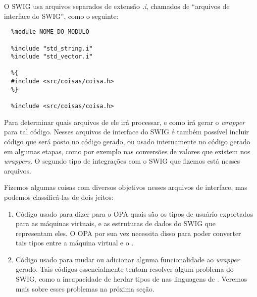   O SWIG usa arquivos separados de extensão \emph{.i}, chamados de ``arquivos de interface do 
  SWIG'', como o seguinte:
  \begin{lstlisting}
  %module NOME_DO_MODULO

  %include "std_string.i"
  %include "std_vector.i"
  
  %{
  #include <src/coisas/coisa.h>
  %}

  %include <src/coisas/coisa.h>
  \end{lstlisting}
  Para determinar quais arquivos de \CXX{} ele irá processar, e como irá gerar o 
  \textit{wrapper} para tal código. Nesses arquivos de interface do SWIG é também 
  possível incluir código que será posto no código gerado, ou usado
  internamente no código gerado em algumas etapas, como por exemplo nas conversões de valores
  que existem nos \textit{wrappers}. O segundo tipo de integrações com o SWIG que fizemos está
  nesses arquivos.
  
  Fizemos algumas coisas com diversos objetivos nesses arquivos de interface, mas podemos
  classificá-las de dois jeitos:
  \begin{enumerate}
    \item Código usado para dizer para o OPA quais são os tipos de usuário exportados para
      as máquinas virtuais, e as estruturas de dados do SWIG que representam eles. O OPA
      por sua vez necessita disso para poder converter tais tipos entre a máquina virtual
      e o \CXX{}.
    \item Código usado para mudar ou adicionar alguma funcionalidade ao \textit{wrapper}
      gerado. Tais códigos essencialmente tentam resolver algum problema do SWIG, como
      a incapacidade de herdar tipos de \CXX{} nas linguagens de \script{}. Veremos mais
      sobre esses problemas na próxima seção.
  \end{enumerate}
  

